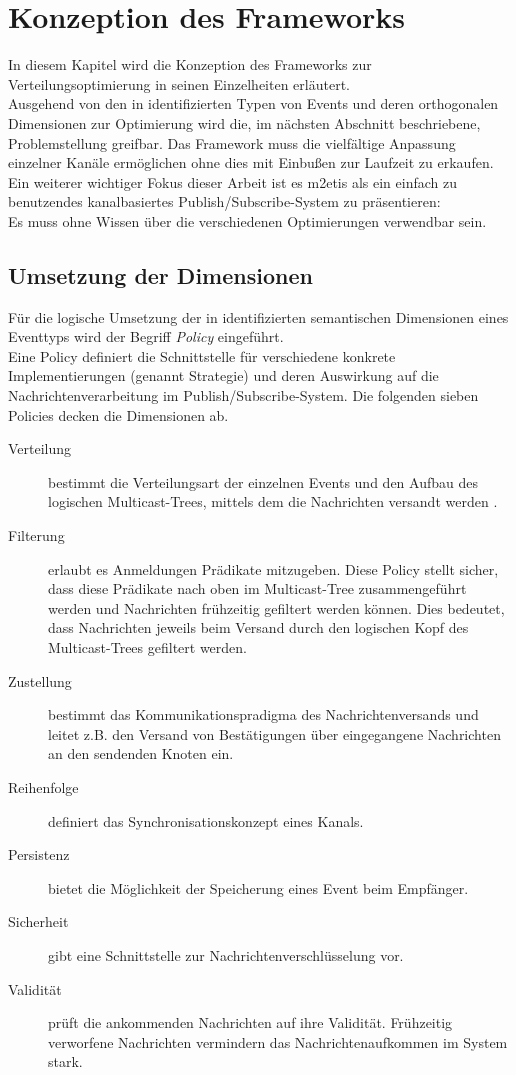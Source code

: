 \chapter{Konzeption des Frameworks}
\label{chap:konzeption_pubsub}
In diesem Kapitel wird die Konzeption des Frameworks zur Verteilungsoptimierung in seinen Einzelheiten erläutert.\\
Ausgehend von den in \cite{Fischer2010a} identifizierten Typen von Events und deren orthogonalen Dimensionen zur Optimierung wird die, im nächsten Abschnitt beschriebene, Problemstellung greifbar. Das Framework muss die vielfältige Anpassung einzelner Kanäle ermöglichen ohne dies mit Einbußen zur Laufzeit zu erkaufen. Ein weiterer wichtiger Fokus dieser Arbeit ist es \ac{m2etis} als ein einfach zu benutzendes kanalbasiertes Publish/Subscribe-System zu präsentieren:\\
Es muss ohne Wissen über die verschiedenen Optimierungen verwendbar sein.

\section{Umsetzung der Dimensionen}
Für die logische Umsetzung der in \cite{Fischer2010Event} identifizierten semantischen Dimensionen eines Eventtyps wird der Begriff \emph{Policy} eingeführt.\\
Eine Policy definiert die Schnittstelle für verschiedene konkrete Implementierungen (genannt Strategie) und deren Auswirkung auf die Nachrichtenverarbeitung im Publish/Subscribe-System. Die folgenden sieben Policies decken die Dimensionen ab.

\begin{description}
\item[Verteilung] bestimmt die Verteilungsart der einzelnen Events und den Aufbau des logischen Multicast-Trees, mittels dem die Nachrichten versandt werden \cite{KostasKatrinis2005}.
\item[Filterung] erlaubt es Anmeldungen Prädikate mitzugeben. Diese Policy stellt sicher, dass diese Prädikate nach oben im Multicast-Tree zusammengeführt werden und Nachrichten frühzeitig gefiltert werden können. Dies bedeutet, dass Nachrichten jeweils beim Versand durch den logischen Kopf des Multicast-Trees gefiltert werden.
\item[Zustellung] bestimmt das Kommunikationspradigma des Nachrichtenversands und leitet z.B. den Versand von Bestätigungen über eingegangene Nachrichten an den sendenden Knoten ein.
\item[Reihenfolge] definiert das Synchronisationskonzept eines Kanals.
\item[Persistenz] bietet die Möglichkeit der Speicherung eines Event beim Empfänger.
\item[Sicherheit] gibt eine Schnittstelle zur Nachrichtenverschlüsselung vor.
\item[Validität] prüft die ankommenden Nachrichten auf ihre Validität. Frühzeitig verworfene Nachrichten vermindern das Nachrichtenaufkommen im System stark.
\end{description}

